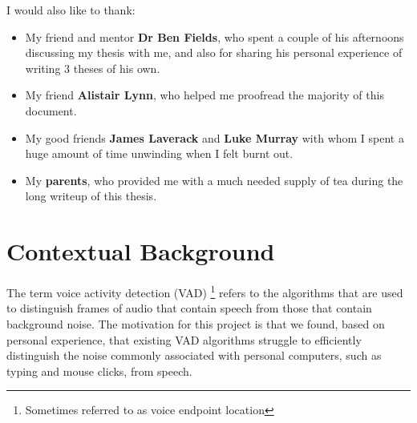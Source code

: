 \documentclass[ %
                    author={Sam Phippen},
                supervisor={Dr. Rafal Bogacz},
                     title={Real time voice activity detectors in noisy personal computing environments},
                  subtitle={},
                    degree={MEng},
                      year={2012} ]{thesis}
\begin{document}
I would also like to thank:
\begin{itemize}

    \item My friend and mentor {\bf Dr Ben Fields}, who spent a couple of his
        afternoons discussing my thesis with me, and also for sharing his
        personal experience of writing 3 theses of his own.


    \item My friend {\bf Alistair Lynn}, who helped me proofread the majority of this
        document.

    \item My good friends {\bf James Laverack} and {\bf Luke Murray} with whom
        I spent a huge amount of time unwinding when I felt burnt out.

    \item My {\bf parents}, who provided me with a much needed supply of tea
        during the long writeup of this thesis.

\end{itemize}


%

\mainmatter


\chapter{Contextual Background}
\label{chap:context}

\vspace{1cm}

The term voice activity detection (VAD) \footnote{Sometimes referred to as voice
endpoint location\cite{Tuske}} refers to the algorithms that are used to
distinguish frames of audio that contain speech from those that contain
background noise\cite{ramirez}. The motivation for this project is that we
found, based on personal experience, that existing VAD algorithms struggle to
efficiently distinguish the noise commonly associated with personal computers,
such as typing and mouse clicks, from speech.
\end{document}
